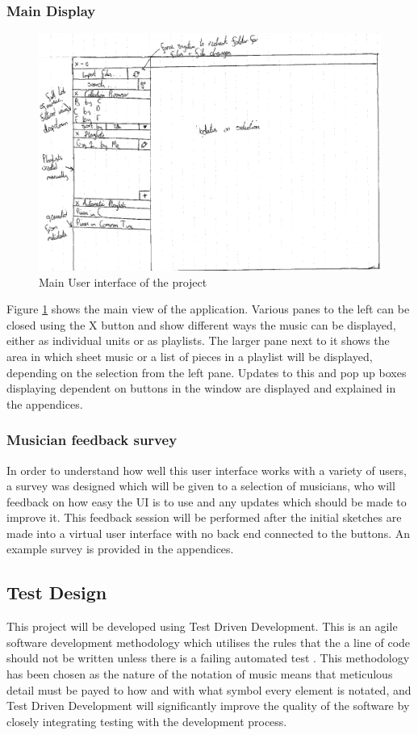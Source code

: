 \subsubsection{Main Display}
\begin{figure}[H]
    \includegraphics[width=400pt]{designs/main}
    \caption{Main User interface of the project}
    \label{fig:main}
\end{figure}
Figure \ref{fig:main} shows the main view of the application. Various panes to the left can be closed using the X button and show different ways the music can be displayed, either as individual units or as playlists. The larger pane next to it shows the area in which sheet music or a list of pieces in a playlist will be displayed, depending on the selection from the left pane. Updates to this and pop up boxes displaying dependent on buttons in the window are displayed and explained in the appendices.
\subsubsection{Musician feedback survey}
In order to understand how well this user interface works with a variety of users, a survey was designed which will be given to a selection of musicians, who will feedback on how easy the UI is to use and any updates which should be made to improve it. This feedback session will be performed after the initial sketches are made into a virtual user interface with no back end connected to the buttons. An example survey is provided in the appendices.
\subsection{Test Design}
This project will be developed using Test Driven Development. This is an agile software development methodology which utilises the rules that the a line of code should not be written unless there is a failing automated test \parencite{TDD}. This methodology has been chosen as the nature of the notation of music means that meticulous detail must be payed to how and with what symbol every element is notated, and Test Driven Development will significantly improve the quality of the software by closely integrating testing with the development process.

